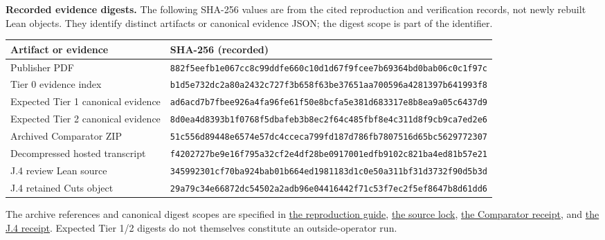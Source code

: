 \documentclass[11pt,letterpaper]{article}
\theoremstyle{definition}\newtheorem{definition}[theorem]{Definition}\newtheorem{example}[theorem]{Example}
\theoremstyle{remark}\newtheorem{remark}[theorem]{Remark}
\newcommand{\follow}[2]{\href{https://github.com/nousentllc/VP-VNP-Review/blob/8a7976933b6b2b4ffda1ad3a0dfb5fc6b6f023e8/#1}{#2}}
\newcommand{\pubsnap}[2]{\href{https://github.com/nousentllc/VP-VNP-Review/blob/c2bd1f6ae02c985a81bf26da5cd3f11c58a6e5e7/#1}{#2}}
\begin{document}
\par\medskip\noindent\textbf{Recorded evidence digests.} The following SHA-256 values are from the cited reproduction and verification records, not newly rebuilt Lean objects. They identify distinct artifacts or canonical evidence JSON; the digest scope is part of the identifier.
\begin{longtable}{@{}p{.27\linewidth}p{.67\linewidth}@{}}\toprule
Artifact or evidence & SHA-256 (recorded) \\\midrule\endhead
Publisher PDF & \nolinkurl{882f5eefb1e067cc8c99ddfe660c10d1d67f9fcee7b69364bd0bab06c0c1f97c}\\
Tier 0 evidence index & \nolinkurl{b1d5e732dc2a80a2432c727f3b658f63be37651aa700596a4281397b641993f8}\\
Expected Tier 1 canonical evidence & \nolinkurl{ad6acd7b7fbee926a4fa96fe61f50e8bcfa5e381d683317e8b8ea9a05c6437d9}\\
Expected Tier 2 canonical evidence & \nolinkurl{8d0ea4d8393b1f0768f5dbafeb3b8ec2f64c485fbf8e4c311d8f9cb9ca7ed2e6}\\
Archived Comparator ZIP & \nolinkurl{51c556d89448e6574e57dc4cceca799fd187d786fb7807516d65bc5629772307}\\
Decompressed hosted transcript & \nolinkurl{f4202727be9e16f795a32cf2e4df28be0917001edfb9102c821ba4ed81b57e21}\\
J.4 review Lean source & \nolinkurl{345992301cf70ba924bab01b664ed1981183d1c0e50a311bf31d3732f90d5b3d}\\
J.4 retained Cuts object & \nolinkurl{29a79c34e66872dc54502a2adb96e04416442f71c53f7ec2f5ef8647b8d61dd6}\\
\bottomrule\end{longtable}
The archive references and canonical digest scopes are specified in \follow{REPRODUCE.md}{the reproduction guide}, \pubsnap{source-lock.json}{the source lock}, \follow{checks/pass14_comparator.json}{the Comparator receipt}, and \follow{followups/j4/verification.json}{the J.4 receipt}. Expected Tier 1/2 digests do not themselves constitute an outside-operator run.
\end{document}

